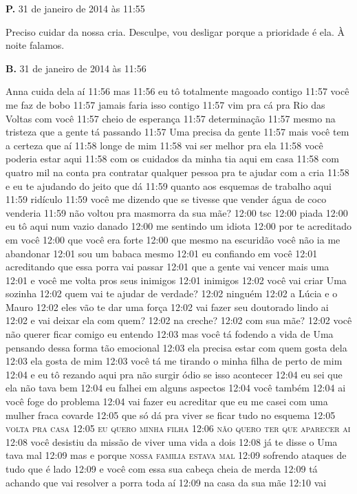 \textbf{P.} 31 de janeiro de 2014 às 11:55

Preciso cuidar da nossa cria. Desculpe, vou desligar porque a prioridade
é ela. À noite falamos.

\textbf{B.} 31 de janeiro de 2014 às 11:56

Anna cuida dela aí 11:56 mas 11:56 eu tô totalmente magoado contigo
11:57 você me faz de bobo 11:57 jamais faria isso contigo 11:57 vim pra
cá pra Rio das Voltas com você 11:57 cheio de esperança 11:57
determinação 11:57 mesmo na tristeza que a gente tá passando 11:57 Uma
precisa da gente 11:57 mais você tem a certeza que aí 11:58 longe de mim
11:58 vai ser melhor pra ela 11:58 você poderia estar aqui 11:58 com os
cuidados da minha tia aqui em casa 11:58 com quatro mil na conta pra
contratar qualquer pessoa pra te ajudar com a cria 11:58 e eu te
ajudando do jeito que dá 11:59 quanto aos esquemas de trabalho aqui
11:59 ridículo 11:59 você me dizendo que se tivesse que vender água de
coco venderia 11:59 não voltou pra masmorra da sua mãe? 12:00 tsc 12:00
piada 12:00 eu tô aqui num vazio danado 12:00 me sentindo um idiota
12:00 por te acreditado em você 12:00 que você era forte 12:00 que mesmo
na escuridão você não ia me abandonar 12:01 sou um babaca mesmo 12:01 eu
confiando em você 12:01 acreditando que essa porra vai passar 12:01 que
a gente vai vencer mais uma 12:01 e você me volta pros seus inimigos
12:01 inimigos 12:02 você vai criar Uma sozinha 12:02 quem vai te ajudar
de verdade? 12:02 ninguém 12:02 a Lúcia e o Mauro 12:02 eles vão te dar
uma força 12:02 vai fazer seu doutorado lindo ai 12:02 e vai deixar ela
com quem? 12:02 na creche? 12:02 com sua mãe? 12:02 você não querer
ficar comigo eu entendo 12:03 mas você tá fodendo a vida de Uma pensando
dessa forma tão emocional 12:03 ela precisa estar com quem gosta dela
12:03 ela gosta de mim 12:03 você tá me tirando o minha filha de perto
de mim 12:04 e eu tô rezando aqui pra não surgir ódio se isso acontecer
12:04 eu sei que ela não tava bem 12:04 eu falhei em alguns aspectos
12:04 você também 12:04 ai você foge do problema 12:04 vai fazer eu
acreditar que eu me casei com uma mulher fraca covarde 12:05 que só dá
pra viver se ficar tudo no esquema 12:05 \textsc{volta pra casa 12:05 eu quero
minha filha 12:06 não quero ter que aparecer ai} 12:08 você desistiu da
missão de viver uma vida a dois 12:08 já te disse o Uma tava mal 12:09
mas e porque \textsc{nossa familia estava mal} 12:09 sofrendo ataques de tudo que
é lado 12:09 e você com essa sua cabeça cheia de merda 12:09 tá achando
que vai resolver a porra toda aí 12:09 na casa da sua mãe 12:10 vai
